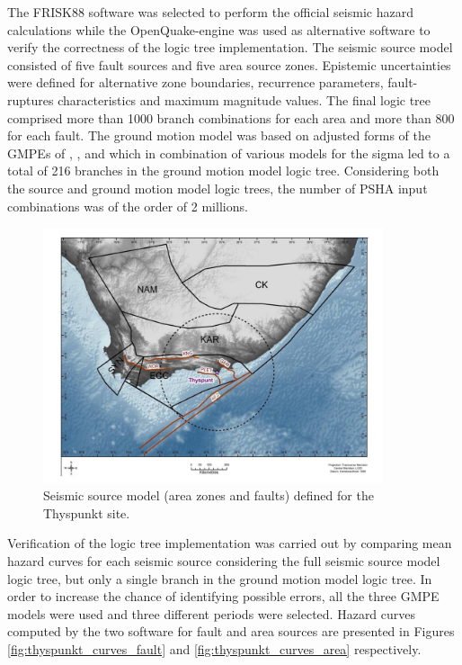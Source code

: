 The FRISK88 software was selected to perform the official seismic hazard calculations while the OpenQuake-engine was used as alternative software to verify the correctness of the logic tree implementation. The seismic source model consisted of five fault sources and five area source zones. Epistemic uncertainties were defined for alternative zone boundaries, recurrence parameters, fault-ruptures characteristics and maximum magnitude values. The final logic tree comprised more than 1000 branch combinations for each area and more than 800 for each fault. The ground motion model was based on adjusted forms of the GMPEs of \citet{abrahamson2008}, \citet{chiou2008}, and \citet{akkar_cagnan_2010} which in combination of various models for the sigma led to a total of 216 branches in the ground motion model logic tree. Considering both the source and ground motion model logic trees, the number of PSHA input combinations was of the order of 2 millions.

\begin{figure}
\centering
\includegraphics[width=10cm]{./qareport/pictures/ThyspunktSourceModel.jpg}
\caption{Seismic source model (area zones and faults) defined for the Thyspunkt site.}
\label{fig:thyspunkt_source_model}
\end{figure}

Verification of the logic tree implementation was carried out by comparing mean hazard curves for each seismic source considering the full seismic source model logic tree, but only a single branch in the ground motion model logic tree. In order to increase the chance of identifying possible errors, all the three GMPE models were used and three different periods were selected. Hazard curves computed by the two software for fault and area sources are presented in Figures \ref{fig:thyspunkt_curves_fault} and \ref{fig:thyspunkt_curves_area} respectively.

